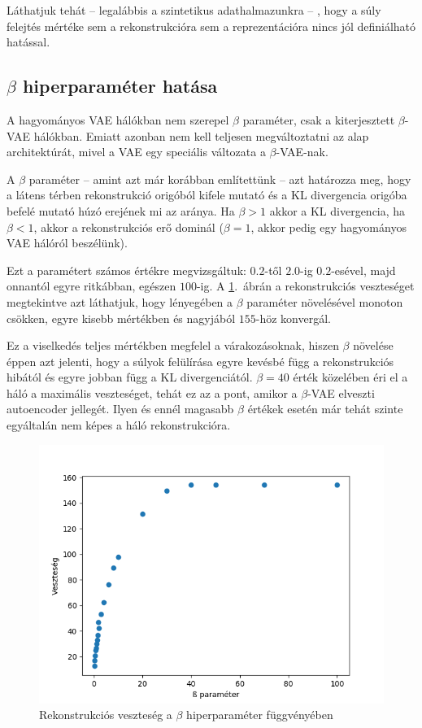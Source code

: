 Láthatjuk tehát -- legalábbis a szintetikus adathalmazunkra -- , hogy a súly felejtés mértéke sem a rekonstrukcióra sem a reprezentációra nincs jól definiálható hatással.

\subsection{$\beta$ hiperparaméter hatása}

A hagyományos VAE hálókban nem szerepel $\beta$ paraméter, csak a kiterjesztett $\beta$-VAE hálókban. Emiatt azonban nem kell teljesen megváltoztatni az alap architektúrát, mivel a VAE egy speciális változata a $\beta$-VAE-nak.

A $\beta$ paraméter -- amint azt már korábban említettünk -- azt határozza meg, hogy a látens térben rekonstrukció origóból kifele mutató és a KL divergencia origóba befelé mutató húzó erejének mi az aránya. Ha $\beta>1$ akkor a KL divergencia, ha $\beta<1$, akkor a rekonstrukciós erő dominál ($\beta=1$, akkor pedig egy hagyományos VAE hálóról beszélünk).

Ezt a paramétert számos értékre megvizsgáltuk: $0.2$-től $2.0$-ig $0.2$-esével, majd onnantól egyre ritkábban, egészen $100$-ig. A \ref{beta-loss}.~ábrán a rekonstrukciós veszteséget megtekintve azt láthatjuk, hogy lényegében a $\beta$ paraméter növelésével monoton csökken, egyre kisebb mértékben és nagyjából $155$-höz konvergál. 

Ez a viselkedés teljes mértékben megfelel a várakozásoknak, hiszen $\beta$ növelése éppen azt jelenti, hogy a súlyok felülírása egyre kevésbé függ a rekonstrukciós hibától és egyre jobban függ a KL divergenciától. $\beta=40$ érték közelében éri el a háló a maximális veszteséget, tehát ez az a pont, amikor a $\beta$-VAE elveszti autoencoder jellegét. Ilyen és ennél magasabb $\beta$ értékek esetén már tehát szinte egyáltalán nem képes a háló rekonstrukcióra.

\begin{figure}[h!]
\begin{center}
  
  \includegraphics[width=0.75\linewidth]{metrics/vae_beta-loss.png}
  \caption{Rekonstrukciós veszteség a $\beta$ hiperparaméter függvényében}\label{beta-loss}
\end{center}
\end{figure}

